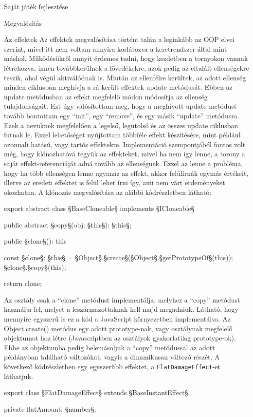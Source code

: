 \begin{MyChapter}{Saját játék fejlesztése}
\begin{MySection}{Megvalósítás}
		\begin{MySubSection}{Az effektek}
			Az effektek megvalósítása történt talán a leginkább az OOP elvei szerint, mivel itt nem voltam annyira korlátozva a keretrendszer által mint máshol. Működésükről annyit érdemes tudni, hogy kezdetben a tornyokon vannak létrehozva, innen továbbkerülnek a lövedékekre, azok pedig az eltalált ellenségekre teszik, ahol végül aktiválódnak is. Miután az ellenfélre kerültek, az adott ellenség minden ciklusban meghívja a rá került effektek update metódusát. Ebben az update metódusban az effekt megfelelő módon módosítja az ellenség tulajdonságait. Ezt úgy valósítottam meg, hogy a meghívott update metódust tovább bontottam egy ``init'', egy ``remove'', és egy másik ``update'' metódusra. Ezek a nevüknek megfelelően a legelső, legutolsó és az összes update ciklusban futnak le. Ezzel lehetőséget nyújtottam többféle effekt készítésére, mint például azonnali hatású, vagy tartós effektekre.
			Implementáció szempontjából fontos volt még, hogy klónozhatóvá tegyük az effekteket, mivel ha nem így lenne, a torony a saját effekt-referenciáját adná tovább az ellenségnek. Ezzel az lenne a probléma, hogy ha több ellenségen lenne ugyanaz az effekt, akkor felülírnák egymás értékeit, illetve az eredeti effektet is felül lehet írni így, ami nem várt erdeményeket okozhatna. A klónozás megvalósítása az alábbi kódrészletben látható:
			\begin{javascript}
export abstract class §\color{jsType}BaseCloneable§ implements §\color{jsType}ICloneable§ {
	public abstract §\color{jsMethod}copy§(obj: §\color{jsType}this§): §\color{jsType}this§;
	
	public §\color{jsMethod}clone§(): this {
		const §\color{jsConst}clone§: §\color{jsType}this§ = §\color{jsType}Object§.§\color{jsMethod}create§(§\color{jsType}Object§.§\color{jsMethod}getPrototypeOf§(this));
		§\color{jsConst}clone§.§\color{jsMethod}copy§(this);
		
		return clone;
	}
}
			\end{javascript}
			Az osztály csak a ``clone'' metódust implementálja, melyhez a ``copy'' metódust használja fel, melyet a leszármazottaknak kell majd megadniuk. Látható, hogy mennyire egyszerű is ez a kód a JavaScript környezetben implementálva. Az Object.create() metódus egy adott prototype-nak, vagy osztálynak megfelelő objektumot hoz létre (Javascriptben az osztályok gyakorlatilag prototype-ok). Ebbe az objektumba pedig belemásoljuk a ``copy'' metódussal az adott példányban található változókat, vagyis a dinamikusan változó részét.
			A következő kódrészletben egy egyszerűbb effektet, a \texttt{FlatDamageEffect}-et láthatjuk. 
			\begin{javascript}
export class §\color{jsType}FlatDamageEffect§ extends §\color{jsType}BaseInstantEffect§ {
	private flatAmount: §\color{jsType}number§;
	
}
\end{javascript}
\end{MySubSection}
\end{MySection}
\end{MyChapter}
